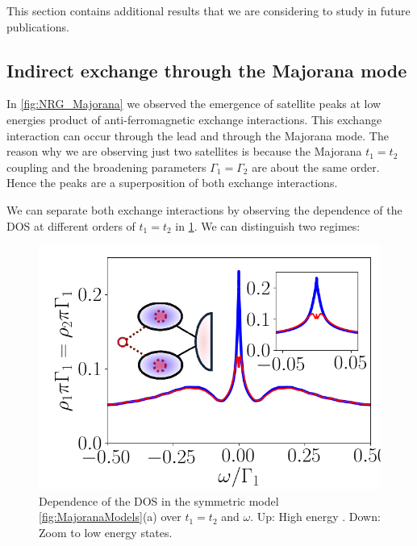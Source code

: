 This section contains additional results that we are considering to study in  future publications. 

\subsection{Indirect exchange through the Majorana mode}

In \ref{fig:NRG_Majorana} we observed the emergence of satellite peaks at low energies product of anti-ferromagnetic exchange interactions. This exchange interaction can occur through the lead and through the Majorana mode. The reason why we are observing just two satellites is because the Majorana $t_1=t_2$ coupling and the broadening parameters $\Gamma_1 = \Gamma_2$ are about the same order. Hence the peaks are a superposition of both exchange interactions. 

We can separate both exchange interactions by observing the dependence of the DOS at different orders of $t_1=t_2$ in \ref{fig:indirect}. We can distinguish two regimes:

\begin{figure}[t]
\centering
\includegraphics[scale=0.4]{IMAGES/NRG/Lowt1=t2.png}
\caption{\label{fig:indirect} Dependence of the DOS in the symmetric model \ref{fig:MajoranaModels}(a) over $t_1=t_2$ and $\omega$. Up: High energy . Down: Zoom to low energy states.  \protect{}}
\end{figure}

